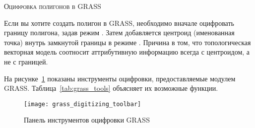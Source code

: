 \begin{Tip}\caption{\textsc{Оцифровка полигонов в GRASS}}
Если вы хотите создать полигон в GRASS, необходимо вначале оцифровать
границу полигона, задав режим . Затем
добавляется центроид (именованная точка) внутрь замкнутой границы в
режиме . Причина в том, что
топологическая векторная модель соотносит аттрибутивную информацию
всегда с центроидом, а не с границей.
\end{Tip}

\label{label_grasstoolbar}

На рисунке~\ref{fig:grass_digitizing_toolbar} показаны инструменты
оцифровки, предоставляемые модулем GRASS. Таблица~\ref{tab:grass_tools}
объясняет их возможные функции.

\begin{figure}[h]
   \centering
   \texttt{[image: grass\_digitizing\_toolbar]}
   \caption{Панель инструментов оцифровки GRASS \wincaption}\label{fig:grass_digitizing_toolbar}
\end{figure}

